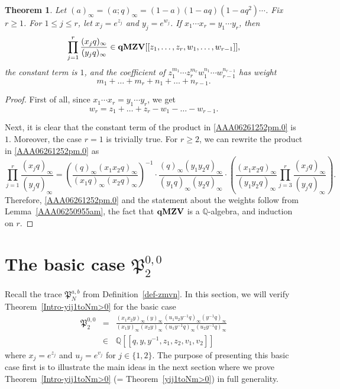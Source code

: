 \documentclass[12pt, reqno]{amsart}
\newtheorem{theorem}{Theorem}[section]
\theoremstyle{definition}
\theoremstyle{remark}
\numberwithin{equation}{section}
\newcommand{\Q}{ \mathbb Q }
\newcommand{\qMZV}{ {\bf qMZV} }
\numberwithin{equation}{section}
\begin{document}
\begin{theorem}   \label{AAA06261252pm}
Let $(a)_\infty = (a; q)_\infty = (1-a)(1-aq)(1-aq^2) \cdots$.
Fix $r \ge 1$. For $1 \le j \le r$, let $x_j = e^{z_j}$ 
and $y_j = e^{w_j}$. If $x_1 \cdots x_r = y_1 \cdots y_r$,
then 
\begin{eqnarray}    \label{AAA06261252pm.0}
\prod_{j = 1}^r \frac{(x_jq)_\infty}{(y_jq)_\infty} 
\in \qMZV[[z_1, \ldots, z_r, w_1, \ldots, w_{r-1}]],
\end{eqnarray}
the constant term is $1$, and the coefficient of 
$z_1^{m_1} \cdots z_r^{m_r} w_1^{n_1} \cdots w_{r-1}^{n_{r-1}}$ has weight
$$
m_1 + \ldots + m_r + n_1 + \ldots + n_{r-1}.
$$
\end{theorem}
\begin{proof}
First of all, since $x_1 \cdots x_r = y_1 \cdots y_r$, we get 
$$
w_r = z_1 + \ldots + z_r - w_1 - \ldots - w_{r-1}.
$$

Next, it is clear that the constant term of the product in 
\eqref{AAA06261252pm.0} is $1$. 
Moreover, the case $r=1$ is trivially true. 
For $r \ge 2$, we can rewrite the product in 
\eqref{AAA06261252pm.0} as
$$
  \prod_{j = 1}^r \frac{(x_jq)_\infty}{(y_jq)_\infty} 
= \left (\frac{(q)_\infty(x_1x_2q)_\infty}{(x_1q)_\infty (x_2q)_\infty} 
  \right )^{-1} \cdot
  \frac{(q)_\infty (y_1y_2q)_\infty}{(y_1q)_\infty(y_2q)_\infty} \cdot
  \left (\frac{(x_1x_2q)_\infty}{(y_1y_2q)_\infty}
  \prod_{j = 3}^r \frac{(x_jq)_\infty}{(y_jq)_\infty} \right ).
$$
Therefore, \eqref{AAA06261252pm.0} and the statement about the weights 
follow from Lemma~\ref{AAA06250955am}, the fact that $\qMZV$ is 
a $\Q$-algebra, and induction on $r$.
\end{proof}

\section{\bf The basic case $\mathfrak P_{2}^{0,0}$} 
\label{sect_1to2}

Recall the trace $\mathfrak P_{N}^{a,b}$ from Definition~\ref{def-zmvn}.
In this section, we will verify Theorem~\ref{Intro-yij1toNm>0} 
for the basic case 
\begin{eqnarray*}     
   \mathfrak P_{2}^{0,0}
&=&\frac{(x_1x_2y)_\infty (y)_\infty}{(x_1y)_\infty (x_2y)_\infty} 
   \frac{(u_1u_2y^{-1}q)_\infty (y^{-1}q)_\infty}
     {(u_1y^{-1}q)_\infty (u_2y^{-1}q)_\infty}     \\
&\in&\Q[[q, y, y^{-1}, z_1, z_2, v_1, v_2]]
\end{eqnarray*}   
where $x_j = e^{z_j}$ and $u_j = e^{v_j}$ for $j \in \{1, 2\}$. 
The purpose of presenting this basic case first is to illustrate 
the main ideas in the next section where we prove 
Theorem~\ref{Intro-yij1toNm>0} (= Theorem~\ref{yij1toNm>0}) 
in full generality. 
\end{document}
